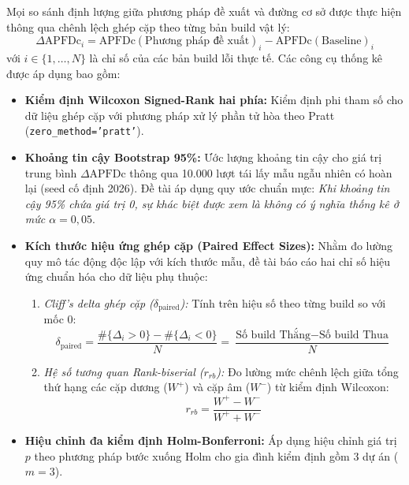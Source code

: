Mọi so sánh định lượng giữa phương pháp đề xuất và đường cơ sở được thực hiện thông qua chênh lệch ghép cặp theo từng bản build vật lý:
\begin{equation}
\Delta\text{APFDc}_i = \text{APFDc}(\text{Phương pháp đề xuất})_i - \text{APFDc}(\text{Baseline})_i
\end{equation}
với $i \in \{1, \dots, N\}$ là chỉ số của các bản build lỗi thực tế. Các công cụ thống kê được áp dụng bao gồm:
\begin{itemize}
    \item \textbf{Kiểm định Wilcoxon Signed-Rank hai phía:} Kiểm định phi tham số cho dữ liệu ghép cặp với phương pháp xử lý phần tử hòa theo Pratt (\texttt{zero\_method='pratt'}).
    \item \textbf{Khoảng tin cậy Bootstrap 95\%:} Ước lượng khoảng tin cậy cho giá trị trung bình $\Delta\text{APFDc}$ thông qua 10.000 lượt tái lấy mẫu ngẫu nhiên có hoàn lại (seed cố định 2026). Đề tài áp dụng quy ước chuẩn mực: \textit{Khi khoảng tin cậy 95\% chứa giá trị 0, sự khác biệt được xem là không có ý nghĩa thống kê ở mức $\alpha = 0,05$}.
    \item \textbf{Kích thước hiệu ứng ghép cặp (Paired Effect Sizes):} Nhằm đo lường quy mô tác động độc lập với kích thước mẫu, đề tài báo cáo hai chỉ số hiệu ứng chuẩn hóa cho dữ liệu phụ thuộc:
    \begin{enumerate}
        \item \textit{Cliff's delta ghép cặp ($\delta_{\text{paired}}$):} Tính trên hiệu số theo từng build so với mốc 0:
        \begin{equation}
        \delta_{\text{paired}} = \frac{\#\{\Delta_i > 0\} - \#\{\Delta_i < 0\}}{N} = \frac{\text{Số build Thắng} - \text{Số build Thua}}{N}
        \end{equation}
        \item \textit{Hệ số tương quan Rank-biserial ($r_{rb}$):} Đo lường mức chênh lệch giữa tổng thứ hạng các cặp dương ($W^+$) và cặp âm ($W^-$) từ kiểm định Wilcoxon:
        \begin{equation}
        r_{rb} = \frac{W^+ - W^-}{W^+ + W^-}
        \end{equation}
    \end{enumerate}
    \item \textbf{Hiệu chỉnh đa kiểm định Holm-Bonferroni:} Áp dụng hiệu chỉnh giá trị $p$ theo phương pháp bước xuống Holm cho gia đình kiểm định gồm 3 dự án ($m=3$).
\end{itemize}

